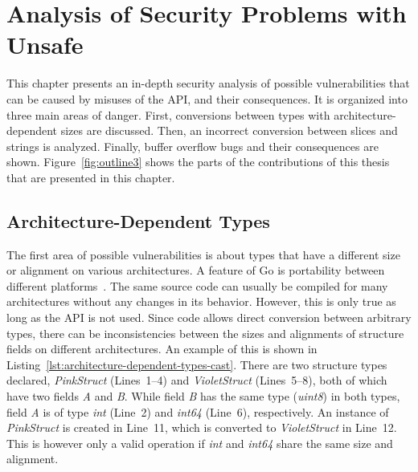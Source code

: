 
\chapter{Analysis of Security Problems with Unsafe}\label{ch:unsafe-security-problems}

This chapter presents an in-depth security analysis of possible vulnerabilities that can be caused by misuses of the
\unsafe{} \acrshort{API}, and their consequences.
It is organized into three main areas of danger.
First, conversions between types with architecture-dependent sizes are discussed.
Then, an incorrect conversion between slices and strings is analyzed.
Finally, buffer overflow bugs and their consequences are shown.
Figure~\ref{fig:outline3} shows the parts of the contributions of this thesis that are presented in this chapter.





\section{Architecture-Dependent Types}\label{sec:unsafe-security-problems:architecture-dependent-types}

The first area of possible vulnerabilities is about types that have a different size or alignment on various
architectures.
A feature of Go is portability between different platforms~\cite{brimzhanova2019}.
The same source code can usually be compiled for many architectures without any changes in its behavior.
However, this is only true as long as the \unsafe{} \acrshort{API} is not used.
Since \unsafe{} code allows direct conversion between arbitrary types, there can be inconsistencies between the sizes
and alignments of structure fields on different architectures.
An example of this is shown in Listing~\ref{lst:architecture-dependent-types-cast}.
There are two structure types declared, \textit{PinkStruct} (Lines~1--4) and \textit{VioletStruct} (Lines~5--8), both of
which have two fields \textit{A} and \textit{B}.
While field \textit{B} has the same type (\textit{uint8}) in both types, field \textit{A} is of type \textit{int}
(Line~2) and \textit{int64} (Line~6), respectively.
An instance of \textit{PinkStruct} is created in Line~11, which is converted to \textit{VioletStruct} in Line~12.
This is however only a valid operation if \textit{int} and \textit{int64} share the same size and alignment.

